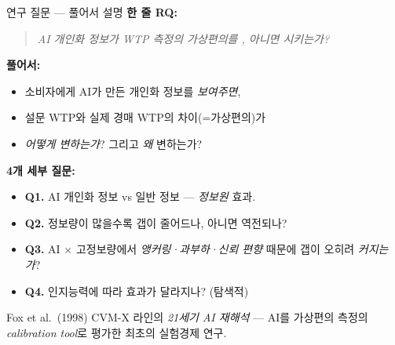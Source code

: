 \documentclass[aspectratio=169]{beamer}
\begin{document}
\begin{frame}{연구 질문 --- 풀어서 설명}
  \textbf{한 줄 RQ:}
  \begin{quote}
    \emph{AI 개인화 정보가 WTP 측정의 가상편의를 , 아니면 시키는가?}
  \end{quote}

  \vspace{0.3em}
  \textbf{풀어서:}
  \begin{itemize}\itemsep0.15em
    \item 소비자에게 AI가 만든 개인화 정보를 \emph{보여주면},
    \item 설문 WTP와 실제 경매 WTP의 차이(=가상편의)가
    \item \emph{어떻게 변하는가}? 그리고 \emph{왜} 변하는가?
  \end{itemize}

  \vspace{0.4em}
  \textbf{4개 세부 질문:}
  \begin{itemize}\itemsep0.1em
    \item \textbf{Q1.} AI 개인화 정보 vs 일반 정보 --- \emph{정보원} 효과.
    \item \textbf{Q2.} 정보량이 많을수록 갭이 줄어드나, 아니면 역전되나?
    \item \textbf{Q3.} AI $\times$ 고정보량에서 \emph{앵커링·과부하·신뢰 편향} 때문에 갭이 오히려 \emph{커지는가}?
    \item \textbf{Q4.} 인지능력에 따라 효과가 달라지나? (탐색적)
  \end{itemize}

  \vspace{0.3em}
   Fox et al.\ (1998) CVM-X 라인의 \emph{21세기 AI 재해석} --- AI를 가상편의 측정의 \emph{calibration tool}로 평가한 최초의 실험경제 연구.
\end{frame}

\end{document}
